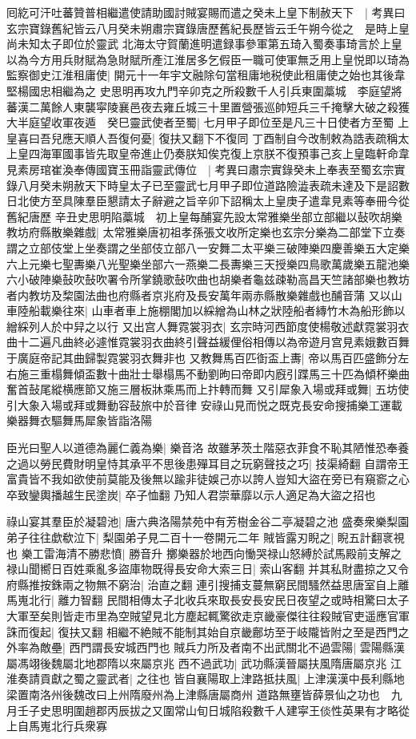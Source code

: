 囘紇可汗吐蕃贊普相繼遣使請助國討賊宴賜而遣之癸未上皇下制赦天下　|{
	考異曰玄宗寶錄舊紀皆云八月癸未朔肅宗寶錄唐歷舊紀長歷皆云壬午朔今從之　是時上皇尚未知太子即位於靈武}
北海太守賀蘭進明遣録事參軍第五琦入蜀奏事琦言於上皇以為今方用兵財賦為急財賦所產江淮居多乞假臣一職可使軍無乏用上皇悦即以琦為監察御史江淮租庸使|{
	開元十一年宇文融除句當租庸地税使此租庸使之始也其後韋堅楊國忠相繼為之}
史思明再攻九門辛卯克之所殺數千人引兵東圍藁城　李庭望將蕃漢二萬餘人東襲寜陵襄邑夜去雍丘城三十里置營張巡帥短兵三千掩擊大破之殺獲大半庭望收軍夜遁　癸巳靈武使者至蜀|{
	七月甲子即位至是凡三十日使者方至蜀}
上皇喜曰吾兒應天順人吾復何憂|{
	復扶又翻下不復同}
丁酉制自今改制敕為誥表疏稱太上皇四海軍國事皆先取皇帝進止仍奏朕知俟克復上京朕不復預事己亥上皇臨軒命韋見素房琯崔渙奉傳國寶玉冊詣靈武傳位　|{
	考異曰肅宗實錄癸未上奉表至蜀玄宗實錄八月癸未朔赦天下時皇太子已至靈武七月甲子即位道路險澁表疏未達及下是詔數日北使方至具陳羣臣懇請太子辭避之旨辛卯下詔稱太上皇庚子遣韋見素等奉冊今從舊紀唐歷}
辛丑史思明陷藁城　初上皇每酺宴先設太常雅樂坐部立部繼以鼔吹胡樂教坊府縣散樂雜戲|{
	太常雅樂唐初祖孝孫張文收所定樂也玄宗分樂為二部堂下立奏謂之立部伎堂上坐奏謂之坐部伎立部八一安舞二太平樂三破陣樂四慶善樂五大定樂六上元樂七聖夀樂八光聖樂坐部六一燕樂二長夀樂三天授樂四鳥歌萬歲樂五龍池樂六小破陣樂鼔吹鼔吹署令所掌鐃歌鼔吹曲也胡樂者龜兹疎勒高昌天竺諸部樂也教坊者内教坊及棃園法曲也府縣者京兆府及長安萬年兩赤縣散樂雜戲也酺音蒲}
又以山車陸船載樂往來|{
	山車者車上施棚閣加以綵繒為山林之狀陸船者縳竹木為船形飾以繒綵列人於中舁之以行}
又出宫人舞霓裳羽衣|{
	玄宗時河西節度使楊敬述獻霓裳羽衣曲十二遍凡曲終必遽惟霓裳羽衣曲終引聲益緩俚俗相傳以為帝遊月宫見素娥數百舞于廣庭帝記其曲歸製霓裳羽衣舞非也}
又教舞馬百匹衘盃上夀|{
	帝以馬百匹盛飾分左右施三重榻舞傾盃數十曲壯士舉榻馬不動劉昫曰帝即内廐引蹀馬三十匹為傾杯樂曲奮首鼔尾縱横應節又施三層板牀乘馬而上抃轉而舞}
又引犀象入場或拜或舞|{
	五坊使引大象入場或拜或舞動容鼔旅中於音律}
安祿山見而悦之既克長安命搜捕樂工運載樂器舞衣驅舞馬犀象皆詣洛陽

臣光曰聖人以道德為麗仁義為樂|{
	樂音洛}
故雖茅茨土階惡衣菲食不恥其陋惟恐奉養之過以勞民費財明皇恃其承平不思後患殫耳目之玩窮聲技之巧|{
	技渠綺翻}
自謂帝王富貴皆不我如欲使前莫能及後無以踰非徒娛己亦以誇人豈知大盜在旁已有窺窬之心卒致鑾輿播越生民塗炭|{
	卒子恤翻}
乃知人君崇華靡以示人適足為大盜之招也

祿山宴其羣臣於凝碧池|{
	唐六典洛陽禁苑中有芳樹金谷二亭凝碧之池}
盛奏衆樂梨園弟子往往歔欷泣下|{
	梨園弟子見二百十一卷開元二年}
賊皆露刃睨之|{
	睨五計翻衺視也}
樂工雷海清不勝悲憤|{
	勝音升}
擲樂器於地西向慟哭禄山怒縛於試馬殿前支解之禄山聞嚮日百姓乘亂多盜庫物既得長安命大索三日|{
	索山客翻}
并其私財盡掠之又令府縣推按銖兩之物無不窮治|{
	治直之翻}
連引搜捕支蔓無窮民間騷然益思唐室自上離馬嵬北行|{
	離力智翻}
民間相傳太子北收兵來取長安長安民日夜望之或時相驚曰太子大軍至矣則皆走市里為空賊望見北方塵起輒驚欲走京畿豪傑往往殺賊官吏遥應官軍誅而復起|{
	復扶又翻}
相繼不絶賊不能制其始自京畿鄜坊至于岐隴皆附之至是西門之外率為敵壘|{
	西門謂長安城西門也}
賊兵力所及者南不出武關北不過雲陽|{
	雲陽縣漢屬馮翊後魏屬北地郡隋以來屬京兆}
西不過武功|{
	武功縣漢晉屬扶風隋唐屬京兆}
江淮奏請貢獻之蜀之靈武者|{
	之往也}
皆自襄陽取上津路抵扶風|{
	上津漢漢中長利縣地梁置南洛州後魏改曰上州隋廢州為上津縣唐屬商州}
道路無壅皆薛景仙之功也　九月壬子史思明圍趙郡丙辰拔之又圍常山旬日城陷殺數千人建寜王倓性英果有才略從上自馬嵬北行兵衆寡

